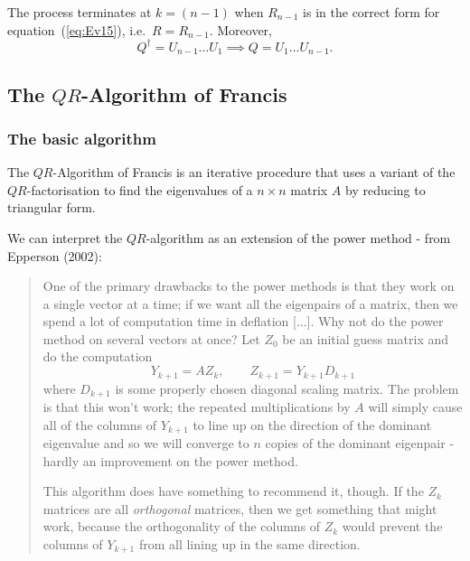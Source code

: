 The process terminates at $k=(n-1)$ when $R_{n-1}$ is in the correct
form for equation~(\ref{eq:Ev15}), i.e.\ $R= R_{n-1}$.  Moreover,
%
\begin{equation*}
  Q^{\dagger} = U_{n-1} \ldots U_{1} \implies
  Q = U_1 \ldots U_{n-1} .
\end{equation*}

\subsection{The \texorpdfstring{$QR$}{QR}-Algorithm of Francis}

\subsubsection{The basic algorithm}

The $QR$-Algorithm of Francis is an iterative procedure that uses a
variant of the $QR$-factorisation to find the eigenvalues of a $n
\times n$ matrix $A$ by reducing to triangular form.

We can interpret the $QR$-algorithm as an extension of the power
method - from Epperson (2002):%

\begin{quote}
  One of the primary drawbacks to the power methods is that they work
  on a single vector at a time; if we want all the eigenpairs of a
  matrix, then we spend a lot of computation time in deflation [...].
  Why not do the power method on several vectors at once?  Let $Z_0$
  be an initial guess matrix and do the computation
  \begin{equation*}
    Y_{k+1} = A Z_k, \qquad Z_{k+1} = Y_{k+1} D_{k+1}
  \end{equation*}
  where $D_{k+1}$ is some properly chosen diagonal scaling matrix.
  The problem is that this won't work; the repeated multiplications by
  $A$ will simply cause all of the columns of $Y_{k+1}$ to line up on
  the direction of the dominant eigenvalue and so we will converge to
  $n$ copies of the dominant eigenpair - hardly an improvement on the
  power method.

  This algorithm does have something to recommend it, though.  If the
  $Z_k$ matrices are all \textit{orthogonal} matrices, then we get
  something that might work, because the orthogonality of the columns
  of $Z_k$ would prevent the columns of $Y_{k+1}$ from all lining up
  in the same direction.
\end{quote}

